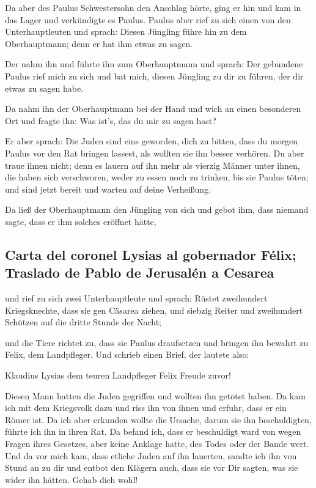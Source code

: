  Da aber des Paulus Schwestersohn den Anschlag hörte,
ging er hin und kam in das Lager und verkündigte es Paulus.
 Paulus aber rief zu sich einen von den Unterhauptleuten
und sprach: Diesen Jüngling führe hin zu dem Oberhauptmann; denn er hat
ihm etwas zu sagen.

 Der nahm ihn und führte ihn zum Oberhauptmann und
sprach: Der gebundene Paulus rief mich zu sich und bat mich, diesen
Jüngling zu dir zu führen, der dir etwas zu sagen habe.

 Da nahm ihn der Oberhauptmann bei der Hand und wich an
einen besonderen Ort und fragte ihn: Was ist's, das du mir zu sagen
hast?

 Er aber sprach: Die Juden sind eins geworden, dich zu
bitten, dass du morgen Paulus vor den Rat bringen lassest, als wollten
sie ihn besser verhören.  Du aber traue ihnen nicht; denn
es lauern auf ihn mehr als vierzig Männer unter ihnen, die haben sich
verschworen, weder zu essen noch zu trinken, bis sie Paulus töten; und
sind jetzt bereit und warten auf deine Verheißung.

 Da ließ der Oberhauptmann den Jüngling von sich und
gebot ihm, dass niemand sagte, dass er ihm solches eröffnet hätte,

\hypertarget{carta-del-coronel-lysias-al-gobernador-fuxe9lix-traslado-de-pablo-de-jerusaluxe9n-a-cesarea}{%
\subsection{Carta del coronel Lysias al gobernador Félix; Traslado de
Pablo de Jerusalén a
Cesarea}\label{carta-del-coronel-lysias-al-gobernador-fuxe9lix-traslado-de-pablo-de-jerusaluxe9n-a-cesarea}}

 und rief zu sich zwei Unterhauptleute und sprach: Rüstet
zweihundert Kriegsknechte, dass sie gen Cäsarea ziehen, und siebzig
Reiter und zweihundert Schützen auf die dritte Stunde der Nacht;

 und die Tiere richtet zu, dass sie Paulus draufsetzen
und bringen ihn bewahrt zu Felix, dem Landpfleger.  Und
schrieb einen Brief, der lautete also:

 Klaudius Lysias dem teuren Landpfleger Felix Freude
zuvor!

 Diesen Mann hatten die Juden gegriffen und wollten ihn
getötet haben. Da kam ich mit dem Kriegsvolk dazu und riss ihn von ihnen
und erfuhr, dass er ein Römer ist.  Da ich aber erkunden
wollte die Ursache, darum sie ihn beschuldigten, führte ich ihn in ihren
Rat.  Da befand ich, dass er beschuldigt ward von wegen
Fragen ihres Gesetzes, aber keine Anklage hatte, des Todes oder der
Bande wert.  Und da vor mich kam, dass etliche Juden auf
ihn lauerten, sandte ich ihn von Stund an zu dir und entbot den Klägern
auch, dass sie vor Dir sagten, was sie wider ihn hätten. Gehab dich
wohl!

